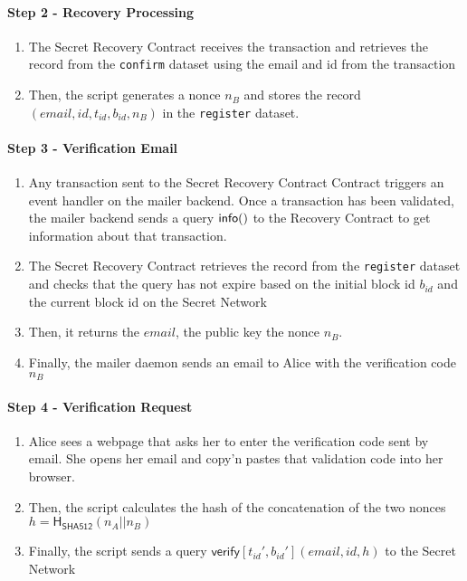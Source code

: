 \documentclass[12pt]{article}
\newcommand{\ms}[1]{\ensuremath{\mathsf{#1}}}
\newcommand{\tx}[3]{\ms{#1}[#2](#3)}
\newcommand{\qry}[3]{\ms{#1}(#3)}
\begin{document}
\paragraph{Step 2 - Recovery Processing}

\begin{enumerate}[label=2.\arabic*]
    \item The Secret Recovery Contract receives the transaction and retrieves the record from the {\tt confirm} dataset using the email and id from the transaction
    \item Then, the script generates a nonce $n_B$ and stores the record $(email, id, t_{id}, b_{id}, n_B)$ in the {\tt register} dataset.
\end{enumerate}

\paragraph{Step 3 - Verification Email}

\begin{enumerate}[label=3.\arabic*]
  \item Any transaction sent to the Secret Recovery Contract Contract triggers an event handler on the mailer backend. Once a transaction has been validated, the mailer backend sends a query $\qry{info}{t_id}$ to the Recovery Contract to get information about that transaction.
  \item The Secret Recovery Contract retrieves the record from the {\tt register} dataset and checks that the query has not expire based on the initial block id $b_{id}$ and the current block id on the Secret Network
  \item Then, it returns the $email$, the public key the nonce $n_B$.
  \item Finally, the mailer daemon sends an email to Alice with the verification code $n_B$
\end{enumerate}

\paragraph{{\bf Step 4} - Verification Request}

\begin{enumerate}[label=4.\arabic*]
  \item Alice sees a webpage that asks her to enter the verification code sent by email. She opens her email and copy'n pastes that validation code into her browser.
  \item Then, the script calculates the hash of the concatenation of the two nonces $h=\ms{H_{\ms{SHA512}}}(n_A || n_B)$
  \item Finally, the script sends a query $\tx{verify}{t_{id}', b_{id}'}{email, id, h}$ to the Secret Network
\end{enumerate}
\end{document}
